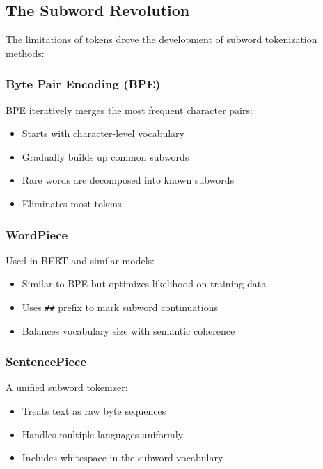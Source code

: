 \subsection{The Subword Revolution}

The limitations of \unk{} tokens drove the development of subword tokenization methods:

\subsubsection{Byte Pair Encoding (BPE)}
BPE iteratively merges the most frequent character pairs:
\begin{itemize}
\item Starts with character-level vocabulary
\item Gradually builds up common subwords
\item Rare words are decomposed into known subwords
\item Eliminates most \unk{} tokens
\end{itemize}

\subsubsection{WordPiece}
Used in BERT and similar models:
\begin{itemize}
\item Similar to BPE but optimizes likelihood on training data
\item Uses \texttt{\#\#} prefix to mark subword continuations
\item Balances vocabulary size with semantic coherence
\end{itemize}

\subsubsection{SentencePiece}
A unified subword tokenizer:
\begin{itemize}
\item Treats text as raw byte sequences
\item Handles multiple languages uniformly
\item Includes whitespace in the subword vocabulary
\end{itemize}

